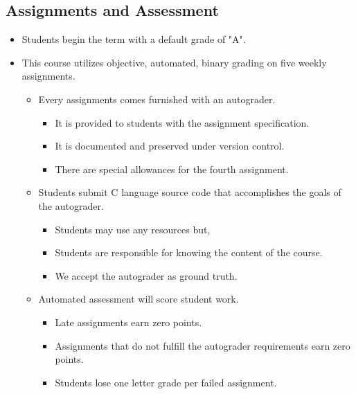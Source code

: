 \documentclass[11pt]{article}
\begin{document}
\subsection*{Assignments and Assessment}

\begin{itemize}
    \item Students begin the term with a default grade of "A".
    \item This course utilizes objective, automated, binary grading on five weekly assignments.
        \begin{itemize}
            \item  Every assignments comes furnished with an autograder.
            \begin{itemize}
                \item  It is provided to students with the assignment specification.
                \item  It is documented and preserved under version control.
                \item There are special allowances for the fourth assignment.
            \end{itemize}
            \item  Students submit C language source code that accomplishes the goals of the autograder.
            \begin{itemize}
                \item  Students may use any resources but,
                \item  Students are responsible for knowing the content of the course.
                \item  We accept the autograder as ground truth.
            \end{itemize}
            \item  Automated assessment will score student work.
            \begin{itemize}
                \item  Late assignments earn zero points.
                \item  Assignments that do not fulfill the autograder requirements earn zero points.
                \item  Students lose one letter grade per failed assignment.
            \end{itemize}
        \end{itemize}
\end{itemize}

\end{document}
